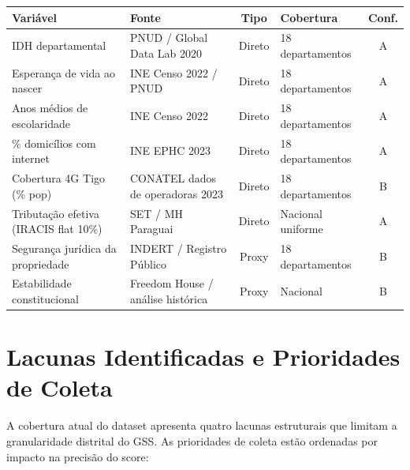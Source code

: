 \medskip
{\small\renewcommand{\arraystretch}{1.3}
\begin{tabular}{@{}p{3.2cm} p{3.5cm} c p{2.2cm} c@{}}
\toprule
\textbf{Variável} & \textbf{Fonte} & \textbf{Tipo} & \textbf{Cobertura} & \textbf{Conf.} \\
\midrule
IDH departamental &
  PNUD / Global Data Lab 2020 &
  Direto &
  18 departamentos &
  A \\
\midrule
Esperança de vida ao nascer &
  INE Censo 2022 / PNUD &
  Direto &
  18 departamentos &
  A \\
\midrule
Anos médios de escolaridade &
  INE Censo 2022 &
  Direto &
  18 departamentos &
  A \\
\midrule
\% domicílios com internet &
  INE EPHC 2023 &
  Direto &
  18 departamentos &
  A \\
\midrule
Cobertura 4G Tigo (\% pop) &
  CONATEL dados de operadoras 2023 &
  Direto &
  18 departamentos &
  B \\
\midrule
Tributação efetiva (IRACIS flat 10\%) &
  SET / MH Paraguai &
  Direto &
  Nacional uniforme &
  A \\
\midrule
Segurança jurídica da propriedade &
  INDERT / Registro Público &
  Proxy &
  18 departamentos &
  B \\
\midrule
Estabilidade constitucional &
  Freedom House / análise histórica &
  Proxy &
  Nacional &
  B \\
\bottomrule
\end{tabular}%
}

\section*{Lacunas Identificadas e Prioridades de Coleta}
\label{apendice:variaveis:lacunas}

A cobertura atual do dataset apresenta quatro lacunas estruturais que
limitam a granularidade distrital do GSS. As prioridades de coleta estão
ordenadas por impacto na precisão do score:

